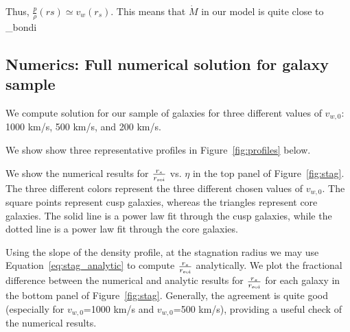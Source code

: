 \documentclass[usenatbib,fleqn]{mn2e}
\newcommand{\Mdotb}{\dot{M}_{\rm bondi}}
\newcommand{\rs}{r_s}
\newcommand{\vw}{v_w}
\newcommand{\cs}{\frac{p}{\rho}}
\newcommand{\soi}{\rm soi}
\newcommand{\rsoi}{r_{\soi}}
\newcommand{\vwO}{v_{w,0}}
\newcommand{\x}{\frac{r_s}{\rsoi}}
\begin{document}
Thus, $\cs(rs)\simeq \vw(\rs)$. This means that $$ in our model is quite close to \Mdotb



\subsection{Numerics: Full numerical solution for galaxy sample}
We compute solution for our sample of galaxies for three different values of $v_{w,0}$: 1000 km/s, 500 km/s, and 200 km/s. 

We show show three representative profiles in Figure~\ref{fig:profiles} below. 

We show the numerical results for $\x$ vs. $\eta$ in the top panel of Figure~\ref{fig:stag}.  The three different colors represent the three different chosen values of $\vwO$. The square points represent cusp galaxies, whereas the triangles represent core galaxies.  The solid line is a power law fit through the cusp galaxies, while the dotted line is a power law fit through the core galaxies. 

Using the slope of the density profile, at the stagnation radius we may use Equation~\ref{eq:stag_analytic} to compute $\x$ analytically. We plot the fractional difference between the numerical and analytic results for $\x$ for each galaxy in the bottom panel of Figure~\ref{fig:stag}.  Generally, the agreement is quite good (especially for $\vwO$=1000 km/s and $\vwO$=500 km/s), providing a useful check of the numerical results. 

\end{document}
